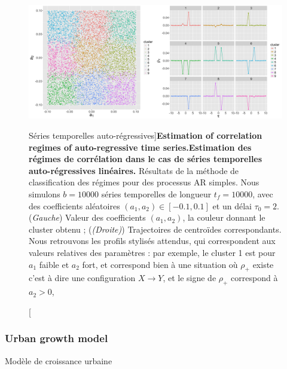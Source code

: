 \begin{figure}
	\includegraphics[width=\linewidth]{Figures/Final/4-2-2-fig-causalityregimes-arma.jpg}
	\caption[Auto-regressive time-series][Séries temporelles auto-régressives]{\textbf{Estimation of correlation regimes of auto-regressive time series.}\label{fig:causalityregimes:arma}}{\textbf{Estimation des régimes de corrélation dans le cas de séries temporelles auto-régressives linéaires.} Résultats de la méthode de classification des régimes pour des processus AR simples. Nous simulons $b = 10000$ séries temporelles de longueur $t_f = 10000$, avec des coefficients aléatoires $(a_1,a_2) \in [-0.1,0.1]$ et un délai $\tau_0 = 2$. (\textit{Gauche}) Valeur des coefficients $(a_1,a_2)$, la couleur donnant le cluster obtenu ; (\textit{(Droite)}) Trajectoires de centroïdes correspondants. Nous retrouvons les profils stylisés attendus, qui correspondent aux valeurs relatives des paramètres : par exemple, le cluster 1 est pour $a_1$ faible et $a_2$ fort, et correspond bien à une situation où $\rho_+$ existe c'est à dire une configuration $X\rightarrow Y$, et le signe de $\rho_+$ correspond à $a_2 >0$, \label{fig:causalityregimes:arma}}
\end{figure}



\subsubsection{Urban growth model}{Modèle de croissance urbaine}

